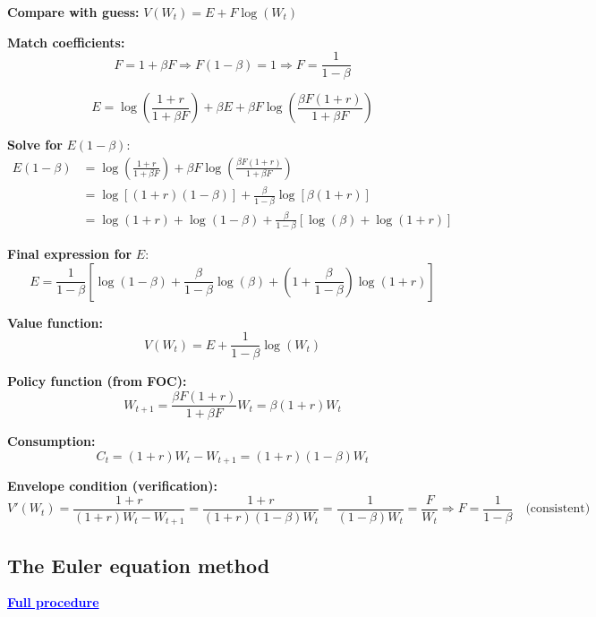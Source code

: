 \documentclass[12pt]{article}
\begin{document}
{\textbf{Compare with guess:} $V(W_t) = E + F \log(W_t)$

\textbf{Match coefficients:}
\[
F = 1 + \beta F \Rightarrow F(1 - \beta) = 1 \Rightarrow F = \frac{1}{1 - \beta}
\]

\[
E = \log\left( \frac{1 + r}{1 + \beta F} \right) + \beta E + \beta F \log\left( \frac{\beta F(1 + r)}{1 + \beta F} \right)
\]

\textbf{Solve for } $E(1 - \beta)$:
\begin{align*}
E(1 - \beta) &= \log\left( \frac{1 + r}{1 + \beta F} \right)
+ \beta F \log\left( \frac{\beta F(1 + r)}{1 + \beta F} \right) \\
&= \log[(1 + r)(1 - \beta)] + \frac{\beta}{1 - \beta} \log[\beta(1 + r)] \\
&= \log(1 + r) + \log(1 - \beta)
+ \frac{\beta}{1 - \beta} \left[ \log(\beta) + \log(1 + r) \right]
\end{align*}

\textbf{Final expression for } $E$:
\[
E = \frac{1}{1 - \beta} \left[
\log(1 - \beta)
+ \frac{\beta}{1 - \beta} \log(\beta)
+ \left(1 + \frac{\beta}{1 - \beta} \right) \log(1 + r)
\right]
\]

\textbf{Value function:}
\[
V(W_t) = E + \frac{1}{1 - \beta} \log(W_t)
\]

\textbf{Policy function (from FOC):}
\[
W_{t+1} = \frac{\beta F(1 + r)}{1 + \beta F} W_t
= \beta(1 + r) W_t
\]

\textbf{Consumption:}
\[
C_t = (1 + r)W_t - W_{t+1} = (1 + r)(1 - \beta)W_t
\]

\textbf{Envelope condition (verification):}
\[
V'(W_t) = \frac{1 + r}{(1 + r)W_t - W_{t+1}}
= \frac{1 + r}{(1 + r)(1 - \beta) W_t}
= \frac{1}{(1 - \beta) W_t}
= \frac{F}{W_t}
\Rightarrow F = \frac{1}{1 - \beta}
\quad \text{(consistent)}
\]

}

\subsection*{\noindent\textbf{The Euler equation method}}

\textcolor{blue}{\textbf{\uline{Full procedure}}}
\end{document}
